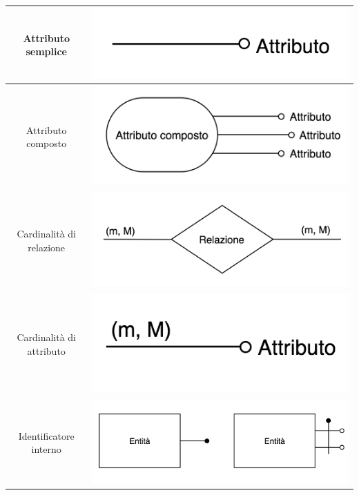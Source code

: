 \begin{table}
\begin{center}
\begin{tabular}{|c|c|}
        Attributo semplice & \includegraphics[scale = 0.4]{13/img2}  \\ \hline
        Attributo composto & \includegraphics[scale = 0.4]{13/img3}  \\ \hline
        Cardinalità di relazione & \includegraphics[scale = 0.4]{13/img4}  \\ \hline
        Cardinalità di attributo & \includegraphics[scale = 0.4]{13/img5}  \\ \hline
        Identificatore interno & \includegraphics[scale = 0.4]{13/img6}  \\ \hline

\end{tabular}
\end{center}
\end{table}
